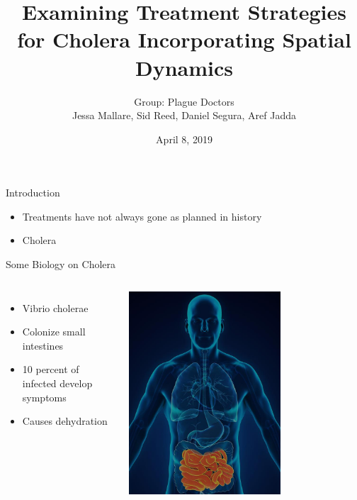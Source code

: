 \documentclass{beamer}\usepackage[]{graphicx}\usepackage[]{color}
\title[Modelling Cholera Treatments]
{Examining Treatment Strategies for Cholera Incorporating Spatial Dynamics}
\author[Plague Doctors]{Group: Plague Doctors \\ Jessa Mallare, Sid Reed, Daniel Segura, Aref Jadda}
\institute[McMaster]{McMaster University \and
Instructor: Dr. David Earn}
\date[April 8, 2019]{April 8, 2019}
\begin{document}
\begin{frame}
\titlepage
\end{frame}

\begin{frame}{Introduction}
\begin{itemize}
\setlength\itemsep{2em}
\item Treatments have not always gone as planned in history
\item Cholera
\end{itemize}
\end{frame}

\begin{frame}{Some Biology on Cholera}
\begin{columns}[onlytextwidth]
\begin{itemize}
\setlength\itemsep{2em}
\item Vibrio cholerae
\item Colonize small intestines
\item 10 percent of infected develop symptoms
\item Causes dehydration
\end{itemize}
\includegraphics[width=0.65\textwidth]{SI.jpg}
\end{columns}
\end{frame}
\end{document}
